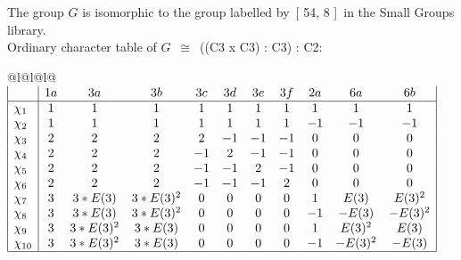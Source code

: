 \documentclass[varwidth=\maxdimen,border=10]{standalone}
\begin{document}
The group $G$ is isomorphic to the group labelled by\ [ 54, 8 ]\ in the Small Groups library.\\
Ordinary character table of $G$\ $\cong$\ ((C3 x C3) : C3) : C2:\\
\begin{center}
\begin{tabular}{@{}l@{}l@{}l@{}}
\hline
\(\begin{array}{|l|cccccccccc|}
  & 1a & 3a & 3b & 3c & 3d & 3e & 3f & 2a & 6a & 6b\\ \hline
\chi_{1} & 1 & 1 & 1 & 1 & 1 & 1 & 1 & 1 & 1 & 1\\
\chi_{2} & 1 & 1 & 1 & 1 & 1 & 1 & 1 & -1 & -1 & -1\\
\chi_{3} & 2 & 2 & 2 & 2 & -1 & -1 & -1 & 0 & 0 & 0\\
\chi_{4} & 2 & 2 & 2 & -1 & 2 & -1 & -1 & 0 & 0 & 0\\
\chi_{5} & 2 & 2 & 2 & -1 & -1 & 2 & -1 & 0 & 0 & 0\\
\chi_{6} & 2 & 2 & 2 & -1 & -1 & -1 & 2 & 0 & 0 & 0\\
\chi_{7} & 3 & 3*E(3) & 3*E(3)^{2} & 0 & 0 & 0 & 0 & 1 & E(3) & E(3)^{2}\\
\chi_{8} & 3 & 3*E(3) & 3*E(3)^{2} & 0 & 0 & 0 & 0 & -1 & -E(3) & -E(3)^{2}\\
\chi_{9} & 3 & 3*E(3)^{2} & 3*E(3) & 0 & 0 & 0 & 0 & 1 & E(3)^{2} & E(3)\\
\chi_{10} & 3 & 3*E(3)^{2} & 3*E(3) & 0 & 0 & 0 & 0 & -1 & -E(3)^{2} & -E(3)\\
\hline
\end{array}\)\\
\end{tabular}
\end{center}
\end{document}
